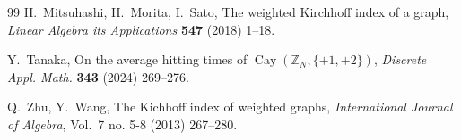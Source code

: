 \documentclass[12pt, leqno]{amsart}
\numberwithin{equation}{section}
\theoremstyle{plain}
\theoremstyle{definition}
\newcommand{\ZZ}{\mathbb{Z}}
\newcommand{\0}{\mathbf{0}}
\DeclareMathOperator{\Cay}{Cay}
\begin{document}
\begin{thebibliography}{99}
H.~Mitsuhashi, H.~Morita, I.~Sato,
The weighted Kirchhoff index of a graph,
{\sl Linear Algebra its Applications} {\bf 547} (2018) 1--18.

Y.~Tanaka,
On the average hitting times of $\Cay(\ZZ_N,\{+1,+2\})$,
{\sl Discrete Appl. Math.} {\bf 343} (2024) 269--276.





Q.~Zhu, Y.~Wang,
The Kichhoff index of weighted graphs,
{\sl International Journal of Algebra}, Vol.~7 no. 5-8 (2013) 267--280.

\end{thebibliography}
\end{document}
